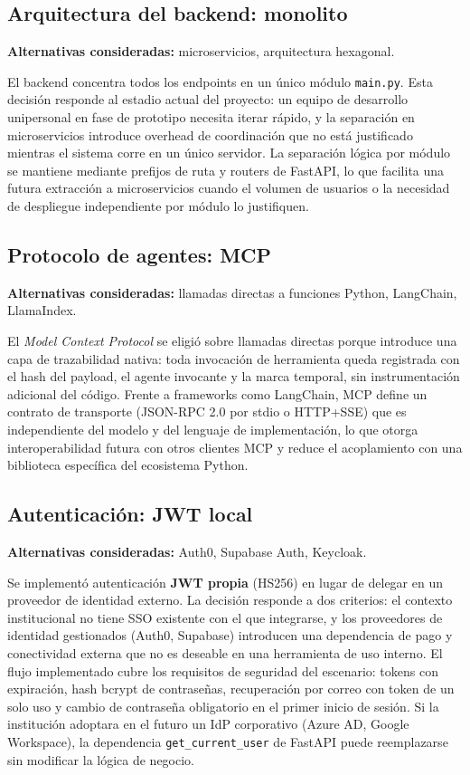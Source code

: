 \subsection*{Arquitectura del backend: monolito}

\textbf{Alternativas consideradas:} microservicios, arquitectura hexagonal.

El backend concentra todos los endpoints en un único módulo
\texttt{main.py}.
Esta decisión responde al estadio actual del proyecto: un equipo de
desarrollo unipersonal en fase de prototipo necesita iterar rápido,
y la separación en microservicios introduce overhead de coordinación que
no está justificado mientras el sistema corre en un único servidor.
La separación lógica por módulo se mantiene mediante prefijos de ruta
y routers de FastAPI, lo que facilita una futura extracción a
microservicios cuando el volumen de usuarios o la necesidad de
despliegue independiente por módulo lo justifiquen.

\subsection*{Protocolo de agentes: MCP}

\textbf{Alternativas consideradas:} llamadas directas a funciones Python,
LangChain, LlamaIndex.

El \emph{Model Context Protocol} se eligió sobre llamadas directas porque
introduce una capa de trazabilidad nativa: toda invocación de herramienta
queda registrada con el hash del payload, el agente invocante y la marca
temporal, sin instrumentación adicional del código.
Frente a frameworks como LangChain, MCP define un contrato de transporte
(JSON-RPC 2.0 por stdio o HTTP+SSE) que es independiente del modelo y
del lenguaje de implementación, lo que otorga interoperabilidad futura
con otros clientes MCP y reduce el acoplamiento con una biblioteca
específica del ecosistema Python.

\subsection*{Autenticación: JWT local}

\textbf{Alternativas consideradas:} Auth0, Supabase Auth, Keycloak.

Se implementó autenticación \textbf{JWT propia} (HS256) en lugar de
delegar en un proveedor de identidad externo.
La decisión responde a dos criterios: el contexto institucional no tiene
SSO existente con el que integrarse, y los proveedores de identidad
gestionados (Auth0, Supabase) introducen una dependencia de pago y
conectividad externa que no es deseable en una herramienta de uso
interno.
El flujo implementado cubre los requisitos de seguridad del escenario:
tokens con expiración, hash bcrypt de contraseñas, recuperación por
correo con token de un solo uso y cambio de contraseña obligatorio en
el primer inicio de sesión.
Si la institución adoptara en el futuro un IdP corporativo (Azure AD,
Google Workspace), la dependencia \texttt{get\_current\_user} de FastAPI
puede reemplazarse sin modificar la lógica de negocio.


